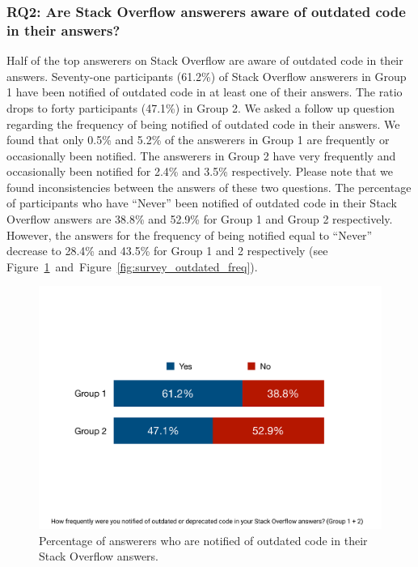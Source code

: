 \documentclass{svjour3}                     %
\begin{document}
\subsubsection*{RQ2: Are Stack Overflow answerers aware of outdated code in their answers?}

Half of the top answerers on Stack Overflow are aware of outdated code in their
answers. Seventy-one participants (61.2\%) of Stack Overflow answerers in Group
1 have been notified of outdated code in at least one of their answers. The
ratio drops to forty participants (47.1\%) in Group 2. We asked a follow up
question regarding the frequency of being notified of outdated code in their
answers. We found that only 0.5\% and 5.2\% of the answerers in Group 1
are frequently or occasionally been notified. The answerers in Group 2 have very
frequently and occasionally been notified for 2.4\% and 3.5\% respectively.
Please note that we found inconsistencies between the answers of these two
questions. The percentage of participants who have ``Never'' been notified of
outdated code in their Stack Overflow answers are 38.8\% and 52.9\% for Group 1
and Group 2 respectively. However, the answers for the frequency of being notified
equal to ``Never'' decrease to 28.4\% and 43.5\% for Group 1 and 2 respectively
(see
Figure~\ref{fig:survey_outdated}~and~Figure~\ref{fig:survey_outdated_freq}).

\begin{figure}
	\centering
	\includegraphics[width=.5\linewidth]{survey_outdated}
	\caption{Percentage of answerers who are notified of outdated code in their Stack Overflow answers.}
	\label{fig:survey_outdated}
\end{figure}
\end{document}
